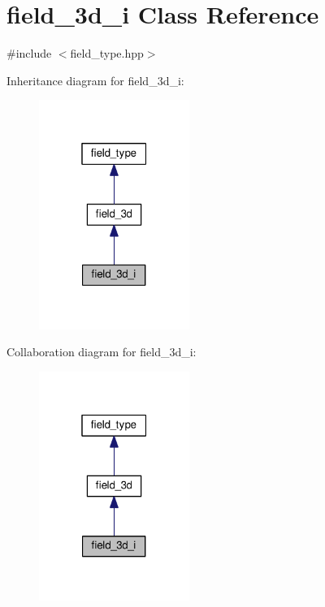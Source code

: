 \hypertarget{classfield__3d__i}{}\section{field\+\_\+3d\+\_\+i Class Reference}
\label{classfield__3d__i}


{\ttfamily \#include $<$field\+\_\+type.\+hpp$>$}



Inheritance diagram for field\+\_\+3d\+\_\+i\+:
\nopagebreak
\begin{figure}[H]
\begin{center}
\leavevmode
\includegraphics[width=139pt]{db/d8f/classfield__3d__i__inherit__graph}
\end{center}
\end{figure}


Collaboration diagram for field\+\_\+3d\+\_\+i\+:
\nopagebreak
\begin{figure}[H]
\begin{center}
\leavevmode
\includegraphics[width=139pt]{dd/ddc/classfield__3d__i__coll__graph}
\end{center}
\end{figure}
